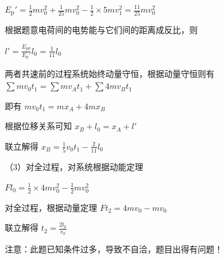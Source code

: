 \documentclass[\gkver]{gaokaozhenti}
\begin{document}
\begin{enumerate}
{$E_{\mathrm{p}}' = \frac{1}{2}mv_{0}^{2} + \frac{1}{25}mv_{0}^{2} - \frac{1}{2} \times 5mv_{1}^{2} = \frac{11}{25}mv_{0}^{2}$

根据题意电荷间的电势能与它们间的距离成反比，则

$l' = \frac{E_{\mathrm{p}0}}{E_{\mathrm{p}}'}l_{0} = \frac{1}{11}l_{0}$

两者共速前的过程系统始终动量守恒，根据动量守恒则有 $\sum mv_{0}t_{1} = \sum mv_{A}t_{1} + \sum 4mv_{B}t_{1}$

即有 $mv_{0}t_{1} = mx_{A} + 4mx_{B}$

根据位移关系可知 $x_{B} + l_{0} = x_{A} + l'$

联立解得 $x_{B} = \frac{1}{5}v_{0}t_{1} - \frac{2}{11}l_{0}$

（3）对全过程，对系统根据动能定理

$Fl_{0} = \frac{1}{2} \times 4mv_{0}^{2} - \frac{1}{2}mv_{0}^{2}$

对全过程，根据动量定理 $Ft_{2} = 4mv_{0} - mv_{0}$

联立解得 $t_{2} = \frac{2l_{0}}{v_{0}}$

注意：此题已知条件过多，导致不自洽，题目出得有问题！
}

\end{enumerate}
\end{document}
